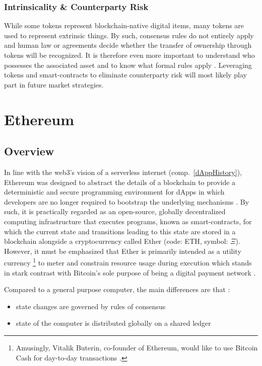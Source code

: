 \subsubsection{Intrinsicality \& Counterparty Risk}
While some tokens represent blockchain-native digital items, many tokens are used to represent extrinsic things. By such, consensus rules do not entirely apply and human law or agreements decide whether the transfer of ownership through tokens will be recognized. It is therefore even more important to understand who possesses the associated asset and to know what formal rules apply \cite[pp.~175--176]{Antonopoulos.2018}. Leveraging tokens and smart-contracts to eliminate counterparty risk will most likely play part in future market strategies.

\pagebreak

\section{Ethereum}
\subsection{Overview}
\label{sec:ethereumOverview}
In line with the web3's vision of a serverless internet (comp.~\ref{dAppHistory}), Ethereum was designed to abstract the details of a blockchain to provide a deterministic and secure programming environment for \acp{dApp} in which developers  are no longer required to bootstrap the underlying mechanisms \cite[p.~27]{Antonopoulos.2018}. By such, it is practically regarded as an open-source, globally decentralized computing infrastructure that executes programs, known as smart-contracts, for which the current state and transitions leading to this state are stored in a blockchain alongside a cryptocurrency called Ether (code: ETH, symbol: $\mathsf{\Xi}$). However, it must be emphasized that Ether is primarily intended as a utility currency \footnote{Amusingly, Vitalik Buterin, co-founder of Ethereum, would like to use Bitcoin Cash for day-to-day transactions \cite{forbes2018}.} to meter and constrain resource usage during execution which stands in stark contrast with Bitcoin's sole purpose of being a digital payment network \cite[p.~23]{Antonopoulos.2018} \cite[p.~1]{bitcoin}.

Compared to a general purpose computer, the main differences are that \cite[p.~28]{Antonopoulos.2018}:

\begin{itemize}
  \item state changes are governed by rules of consensus
  \item state of the computer is distributed globally on a shared ledger
\end{itemize}

